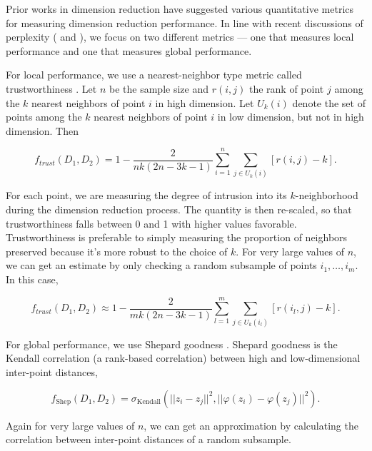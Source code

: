 \documentclass{article}
\begin{document}
Prior works in dimension reduction have suggested various quantitative metrics for measuring dimension reduction performance. In line with recent discussions of perplexity (\cite{t-SNE cell} and \cite{large DR unreliable}), we focus on two different metrics --- one that measures local performance and one that measures global performance.

For local performance, we use a nearest-neighbor type metric called trustworthiness \cite{trustworthiness}. Let $n$ be the sample size and $r(i,j)$ the rank of point $j$ among the $k$ nearest neighbors of point $i$ in high dimension. Let $U_k(i)$ denote the set of points among the $k$ nearest neighbors of point $i$ in low dimension, but not in high dimension. Then \begin{linenomath}$$f_{trust}(D_1, D_2) = 1 - \frac{2}{nk(2n - 3k - 1)}\sum_{i=1}^n \sum_{j \in U_k(i)} \left[ r(i,j) - k \right].$$\end{linenomath} For each point, we are measuring the degree of intrusion into its $k$-neighborhood during the dimension reduction process. The quantity is then re-scaled, so that trustworthiness falls between 0 and 1 with higher values favorable. Trustworthiness is preferable to simply measuring the proportion of neighbors preserved because it's more robust to the choice of $k$. For very large values of $n$, we can get an estimate by only checking a random subsample of points $i_1, \hdots, i_m$. In this case, \begin{linenomath}$$f_{trust}(D_1, D_2) \approx 1 - \frac{2}{mk(2n - 3k - 1)}\sum_{l=1}^m \sum_{j \in U_k(i_l)} \left[ r(i_l,j) - k \right].$$\end{linenomath}

For global performance, we use Shepard goodness \cite{quantitative survey}. Shepard goodness is the Kendall correlation (a rank-based correlation) between high and low-dimensional inter-point distances, \begin{linenomath}$$f_\textrm{Shep}(D_1, D_2) = \sigma_\textrm{Kendall}(||z_i - z_j||^2, ||\varphi(z_i) - \varphi(z_j)||^2).$$\end{linenomath} Again for very large values of $n$, we can get an approximation by calculating the correlation between inter-point distances of a random subsample.
\end{document}
